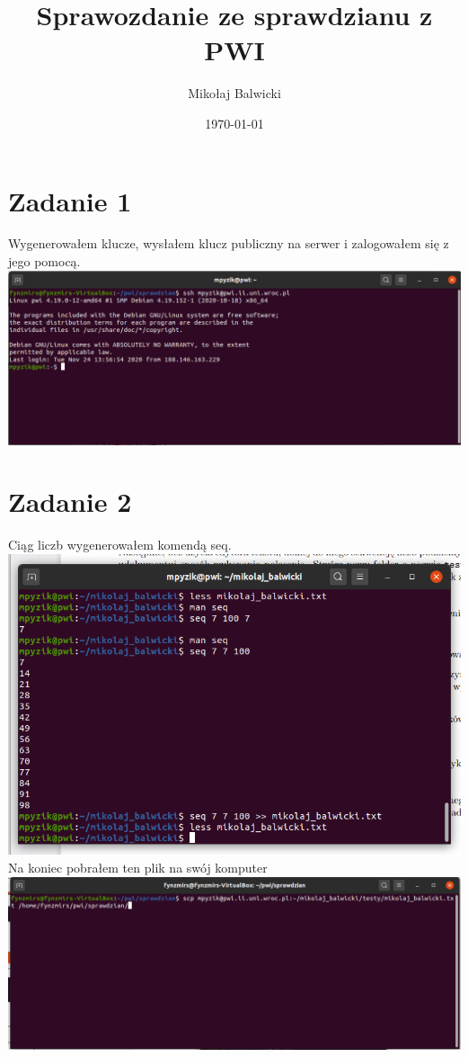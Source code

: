 \documentclass[a4paper,11pt]{article}
\begin{document}
\title{Sprawozdanie ze sprawdzianu z PWI}
\author{Mikołaj Balwicki}
\date{\today}
\maketitle

\section{Zadanie 1}
Wygenerowałem klucze, wysłałem klucz publiczny na serwer i zalogowałem się z jego pomocą.\\
\includegraphics[width=\textwidth]{logowanie.png}

\section{Zadanie 2}
Ciąg liczb wygenerowałem komendą seq.\\
\includegraphics[width=\textwidth]{seq.png}\\
Na koniec pobrałem ten plik na swój komputer\\
\includegraphics[width=\textwidth]{scp.png} 
\end{document}
